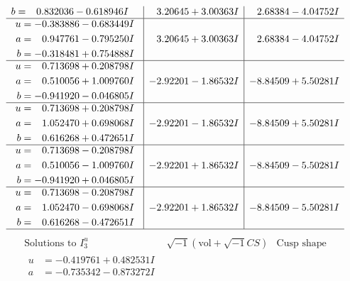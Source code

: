 \documentclass[1p]{elsarticle_modified}
\theoremstyle{definition}
\newcommand{\I}{\sqrt{-1}}
\begin{document}
$$\begin{array}{c|c|c}
\begin{aligned}
b &= \phantom{-}0.832036 - 0.618946 I\end{aligned}
 & \phantom{-}3.20645 + 3.00363 I & \phantom{-}2.68384 - 4.04752 I \\ \hline\begin{aligned}
u &= -0.383886 - 0.683449 I \\
a &= \phantom{-}0.947761 - 0.795250 I \\
b &= -0.318481 + 0.754888 I\end{aligned}
 & \phantom{-}3.20645 + 3.00363 I & \phantom{-}2.68384 - 4.04752 I \\ \hline\begin{aligned}
u &= \phantom{-}0.713698 + 0.208798 I \\
a &= \phantom{-}0.510056 + 1.009760 I \\
b &= -0.941920 - 0.046805 I\end{aligned}
 & -2.92201 - 1.86532 I & -8.84509 + 5.50281 I \\ \hline\begin{aligned}
u &= \phantom{-}0.713698 + 0.208798 I \\
a &= \phantom{-}1.052470 + 0.698068 I \\
b &= \phantom{-}0.616268 + 0.472651 I\end{aligned}
 & -2.92201 - 1.86532 I & -8.84509 + 5.50281 I \\ \hline\begin{aligned}
u &= \phantom{-}0.713698 - 0.208798 I \\
a &= \phantom{-}0.510056 - 1.009760 I \\
b &= -0.941920 + 0.046805 I\end{aligned}
 & -2.92201 + 1.86532 I & -8.84509 - 5.50281 I \\ \hline\begin{aligned}
u &= \phantom{-}0.713698 - 0.208798 I \\
a &= \phantom{-}1.052470 - 0.698068 I \\
b &= \phantom{-}0.616268 - 0.472651 I\end{aligned}
 & -2.92201 + 1.86532 I & -8.84509 - 5.50281 I\\
 \hline 
 \end{array}$$\newpage$$\begin{array}{c|c|c}  
\text{Solutions to }I^u_{3}& \I (\text{vol} + \sqrt{-1}CS) & \text{Cusp shape}\\
 \hline 
\begin{aligned}
u &= -0.419761 + 0.482531 I \\
a &= -0.735342 - 0.873272 I \\

\end{aligned}
\end{array}$$
\end{document}
